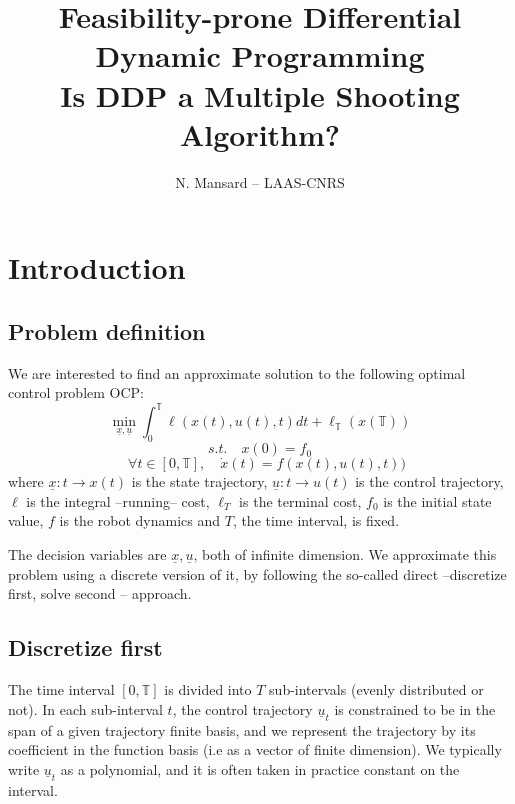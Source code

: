 \documentclass[10pt,a4paper]{article}
\begin{document}
\title{Feasibility-prone Differential Dynamic Programming \\
Is DDP a Multiple Shooting Algorithm?}
\author{N. Mansard -- LAAS-CNRS}

\maketitle


\newcommand{\xtraj}{\underline{x}}
\newcommand{\utraj}{\underline{u}}
\newcommand{\lambdatraj}{\underline{\lambda}}
\newcommand{\dxtraj}{\underline{\Delta x}}
\newcommand{\dutraj}{\underline{\Delta u}}
\newcommand{\dxtrajguess}{\underline{\Delta \bar x}}
\newcommand{\dutrajguess}{\underline{\Delta \bar u}}
\newcommand{\dx}{\Delta x}
\newcommand{\du}{\Delta u}
\newcommand{\Treal}{\mathbb{T}}
\newcommand{\bmat}{\begin{bmatrix}}
\newcommand{\emat}{\end{bmatrix}}
\newcommand{\qed}{\hfill$\square$}

\section{Introduction}

\subsection{Problem definition}
We are interested to find an approximate solution to the following optimal control problem OCP:
$$\min_{\xtraj,\utraj} \int_0^\Treal \ell(x(t),u(t),t) dt + \ell_\Treal(x(\Treal))$$
$$s.t. \quad x(0) = f_0$$
$$\quad \forall t \in [0,\Treal], \quad \dot{x}(t) = f(x(t),u(t),t))$$
where $\xtraj: t \rightarrow x(t)$ is the state trajectory, $\utraj: t \rightarrow u(t)$ is the control trajectory, $\ell$ is the integral --running-- cost, $\ell_T$ is the terminal cost, $f_0$ is the initial state value, $f$ is the robot dynamics and $T$, the time interval, is fixed.

The decision variables are $\xtraj,\utraj$, both of infinite dimension.
We approximate this problem using a discrete version of it, by following the so-called direct --discretize first, solve second -- approach.

\subsection{Discretize first}
The time interval $[0,\Treal]$ is divided into $T$ sub-intervals (evenly distributed or not).
In each sub-interval $t$, the control trajectory $\utraj_t$ is constrained to be in the span of a given trajectory finite basis, and we represent the trajectory by its coefficient in the function basis (i.e as a vector of finite dimension). We typically write $\utraj_t$ as a polynomial, and it is often taken in practice constant on the interval.
\end{document}
